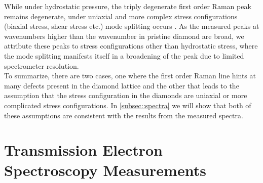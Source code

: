 		While under hydrostatic pressure, the triply degenerate first order Raman peak remains degenerate, under uniaxial and more complex stress configurations (biaxial stress, shear stress etc.) mode splitting occurs \cite{Prawer2004}.
		As the measured peaks at wavenumbers higher than the wavenumber in pristine diamond are broad, we attribute these peaks to stress configurations other than hydrostatic stress, where the mode splitting manifests itself in a broadening of the peak due to limited spectrometer resolution.
		\\
		To summarize, there are two cases, one where the first order Raman line hints at many defects present in the diamond lattice and the other that leads to the assumption that the stress configuration in the diamonds are uniaxial or more complicated stress configurations.
		In \autoref{subsec::spectra} we will show that both of these assumptions are consistent with the results from the measured \pl spectra.

	\section{Transmission Electron Spectroscopy Measurements}{\label{sec::tem}}


